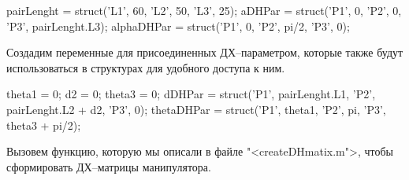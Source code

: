 \documentclass[oneside, final, 14pt]{extarticle}
\begin{document}
{\small \begin{listing}{24}
pairLenght = struct('L1', 60, 'L2', 50, 'L3', 25);
aDHPar = struct('P1', 0, 'P2', 0, 'P3', pairLenght.L3);
alphaDHPar = struct('P1', 0, 'P2', pi/2, 'P3', 0);
\end{listing} 
}
\par

Создадим переменные для присоединенных ДХ--параметром, которые также будут использоваться в структурах для удобного доступа к ним.

{\small \begin{listing}{27}
theta1 = 0;
d2 = 0;
theta3 = 0;
dDHPar = struct('P1', pairLenght.L1, 'P2', pairLenght.L2 + d2, 'P3', 0);
thetaDHPar = struct('P1', theta1, 'P2', pi, 'P3', theta3 + pi/2);
\end{listing} 
}
\par

Вызовем функцию, которую мы описали в файле "<{\ttfamily createDHmatix.m}">, чтобы сформировать ДХ--матрицы манипулятора.
\end{document}
